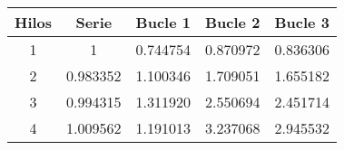 \begin{tabular}{|c|c|c|c|c|}
\hline \textbf{Hilos} & \textbf{Serie} & \textbf{Bucle 1} & \textbf{Bucle 2} & \textbf{Bucle 3
}\\ 
\hline 1 & 1 & 0.744754 & 0.870972 & 0.836306
\\ 
\hline 2 & 0.983352 & 1.100346 & 1.709051 & 1.655182
\\ 
\hline 3 & 0.994315 & 1.311920 & 2.550694 & 2.451714
\\ 
\hline 4 & 1.009562 & 1.191013 & 3.237068 & 2.945532
\\ 
\hline\end{tabular}